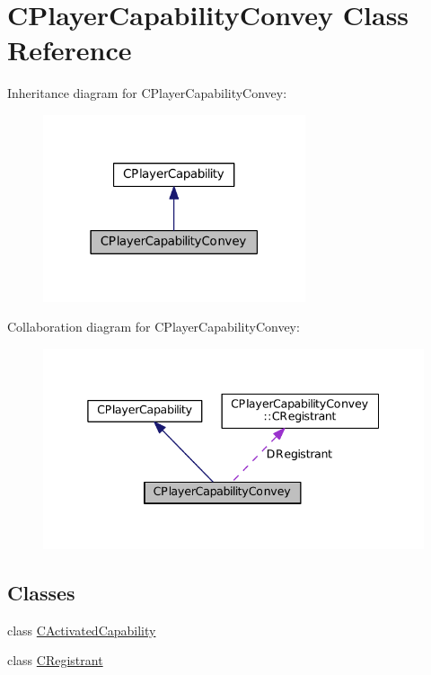 \hypertarget{classCPlayerCapabilityConvey}{}\section{C\+Player\+Capability\+Convey Class Reference}
\label{classCPlayerCapabilityConvey}


Inheritance diagram for C\+Player\+Capability\+Convey\+:\nopagebreak
\begin{figure}[H]
\begin{center}
\leavevmode
\includegraphics[width=219pt]{classCPlayerCapabilityConvey__inherit__graph}
\end{center}
\end{figure}


Collaboration diagram for C\+Player\+Capability\+Convey\+:\nopagebreak
\begin{figure}[H]
\begin{center}
\leavevmode
\includegraphics[width=338pt]{classCPlayerCapabilityConvey__coll__graph}
\end{center}
\end{figure}
\subsection*{Classes}
\begin{DoxyCompactItemize}
\item 
class \hyperlink{classCPlayerCapabilityConvey_1_1CActivatedCapability}{C\+Activated\+Capability}
\item 
class \hyperlink{classCPlayerCapabilityConvey_1_1CRegistrant}{C\+Registrant}
\end{DoxyCompactItemize}
